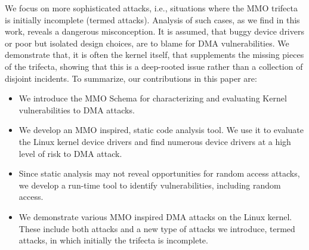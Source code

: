 We focus on more sophisticated attacks, i.e., situations where the MMO trifecta is initially incomplete (termed \compound attacks).
Analysis of such cases, as we find in this work, reveals a dangerous misconception. It is assumed, that buggy device drivers or poor but isolated design choices, are to blame for DMA vulnerabilities. 
We demonstrate that, it is often the kernel itself, that supplements the missing pieces of the trifecta, showing that this is a deep-rooted issue rather than a collection of disjoint incidents.
%
To summarize, our contributions in this paper are:
\begin{itemize}
    \item We introduce the MMO Schema for characterizing and evaluating Kernel vulnerabilities to DMA attacks.
    \item We develop an MMO inspired, static code analysis tool. We use it to evaluate the Linux kernel device drivers and find numerous device drivers at a high level of risk to DMA attack.
    \item Since static analysis may not reveal opportunities for random access attacks, we develop a run-time tool to identify \subpage{} vulnerabilities, including random access.
    \item We demonstrate various MMO inspired DMA attacks on the Linux kernel. These include both \simple{} attacks and a new type of attacks we introduce, termed \compound{} attacks, in which initially the trifecta is incomplete. 
\end{itemize}





